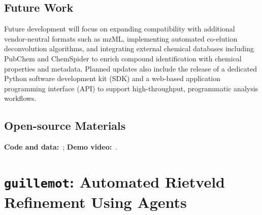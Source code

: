 \subsection*{Future Work}
Future development will focus on expanding compatibility with additional vendor-neutral formats such as mzML, implementing automated co-elution deconvolution algorithms, and integrating external chemical databases including PubChem and ChemSpider to enrich compound identification with chemical properties and metadata. Planned updates also include the release of a dedicated Python software development kit (SDK) and a web-based application programming interface (API) to support high-throughput, programmatic analysis workflows.


\subsection*{Open-source Materials}
\textbf{Code and data:} \,; 
\textbf{Demo video:} \,.








\section{\texttt{guillemot}: Automated Rietveld Refinement Using Agents}

